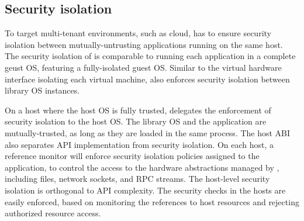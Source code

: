 \subsection{Security isolation}
\label{sec:overview:host:security}


To target multi-tenant environments, such as cloud,
\graphene{} has to ensure security isolation between mutually-untrusting applications running on the same host.
The security isolation of \graphene{} is comparable to running each application
in a complete geust OS, featuring a fully-isolated guest OS.
Similar to the virtual hardware interface isolating each virtual machine,
\thehostabi{} also enforces security isolation between library OS instances.


On a host where the host OS is fully trusted,
\graphene{} delegates the enforcement of security isolation to the host OS.
The library OS and the application are mutually-trusted, as long as they are loaded in the same process.
The host ABI also separates API implementation
from security isolation.
On each host, a reference monitor will enforce security isolation policies assigned to the application, to control the access to the hardware abstractions managed by \thehostabi{}, including files, network sockets, and RPC streams.
The host-level security isolation is orthogonal to API complexity.
The security checks in the hosts are easily enforced,
based on monitoring the references to host resources and rejecting authorized resource access.








